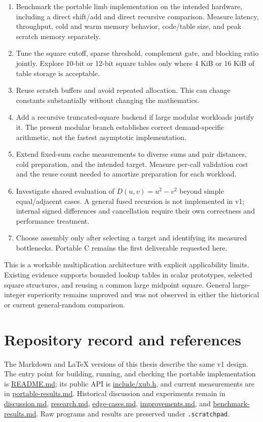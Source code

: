 \documentclass[11pt,a4paper]{article}
\begin{document}
\begin{enumerate}
\item Benchmark the portable limb implementation on the intended hardware, including a direct shift/add and direct recursive comparison. Measure latency, throughput, cold and warm memory behavior, code/table size, and peak scratch memory separately.
\item Tune the square cutoff, sparse threshold, complement gate, and blocking ratio jointly. Explore 10-bit or 12-bit square tables only where 4 KiB or 16 KiB of table storage is acceptable.
\item Reuse scratch buffers and avoid repeated allocation. This can change constants substantially without changing the mathematics.
\item Add a recursive truncated-square backend if large modular workloads justify it. The present modular branch establishes correct demand-specific arithmetic, not the fastest asymptotic implementation.
\item Extend fixed-sum cache measurements to diverse sums and pair distances, cold preparation, and the intended target. Measure per-call validation cost and the reuse count needed to amortize preparation for each workload.
\item Investigate shared evaluation of $D(u,v)=u^2-v^2$ beyond simple equal/adjacent cases. A general fused recursion is not implemented in v1; internal signed differences and cancellation require their own correctness and performance treatment.
\item Choose assembly only after selecting a target and identifying its measured bottlenecks. Portable C remains the first deliverable requested here.
\end{enumerate}

This is a workable multiplication architecture with explicit applicability limits. Existing evidence supports bounded lookup tables in scalar prototypes, selected square structures, and reusing a common large midpoint square. General large-integer superiority remains unproved and was not observed in either the historical or current general-random comparison.

\section{Repository record and references}

The Markdown and LaTeX versions of this thesis describe the same v1 design. The entry point for building, running, and checking the portable implementation is \href{\detokenize{README.md}}{README.md}; its public API is \href{\detokenize{include/xub.h}}{include/xub.h}, and current measurements are in \href{\detokenize{portable-results.md}}{portable-results.md}. Historical discussion and experiments remain in \href{\detokenize{discussion.md}}{discussion.md}, \href{\detokenize{research.md}}{research.md}, \href{\detokenize{edge-cases.md}}{edge-cases.md}, \href{\detokenize{improvements.md}}{improvements.md}, and \href{\detokenize{benchmark-results.md}}{benchmark-results.md}. Raw programs and results are preserved under \texttt{.scratchpad}.
\end{document}
